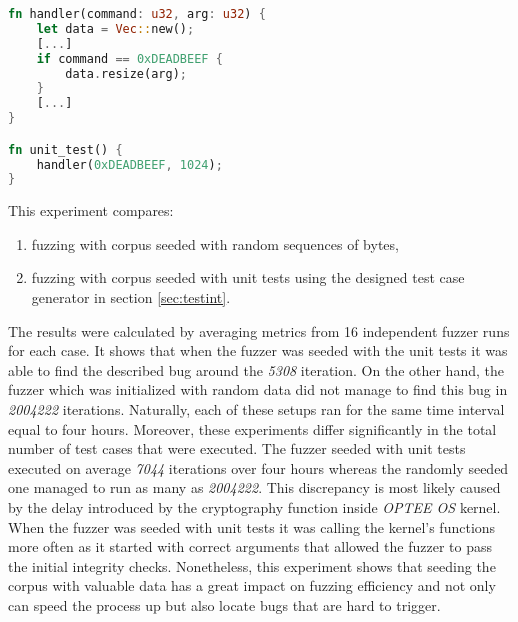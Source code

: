 \begin{minipage}{\linewidth}
    \begin{lstlisting}[language=rust,caption={The allocation bug pseudocode with a unit test.},label={lst:allocbug}]
fn handler(command: u32, arg: u32) {
    let data = Vec::new();
    [...]
    if command == 0xDEADBEEF {
        data.resize(arg);
    }
    [...]
}

fn unit_test() {
    handler(0xDEADBEEF, 1024);
}
    \end{lstlisting}
\end{minipage}



This experiment compares:
\begin{enumerate}
    \item fuzzing with corpus seeded with random sequences of bytes,
    \item fuzzing with corpus seeded with unit tests using the designed test case generator in section \ref{sec:testint}.
\end{enumerate}
The results were calculated by averaging metrics from 16 independent fuzzer runs for each case. It shows that when the fuzzer was seeded with the unit tests it was able to find the described bug around the \textit{5308} iteration. On the other hand, the fuzzer which was initialized with random data did not manage to find this bug in \textit{2004222} iterations. Naturally, each of these setups ran for the same time interval equal to four hours. Moreover, these experiments differ significantly in the total number of test cases that were executed. The fuzzer seeded with unit tests executed on average \textit{7044} iterations over four hours whereas the randomly seeded one managed to run as many as \textit{2004222}. This discrepancy is most likely caused by the delay introduced by the cryptography function inside \textit{OPTEE OS} kernel. When the fuzzer was seeded with unit tests it was calling the kernel's functions more often as it started with correct arguments that allowed the fuzzer to pass the initial integrity checks. Nonetheless, this experiment shows that seeding the corpus with valuable data has a great impact on fuzzing efficiency and not only can speed the process up but also locate bugs that are hard to trigger.

%    

